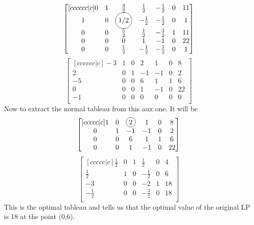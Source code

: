 \documentclass[12pt]{article}
\newcommand*\circled[1]{\tikz[baseline=(char.base)]{
		\node[shape=circle,draw,inner sep=2pt] (char) {#1};}}
\newenvironment{exercise}[2][Exercise]{\begin{trivlist}
		\item[\hskip \labelsep {\bfseries #1}\hskip \labelsep {\bfseries #2.}]}{\end{trivlist}}
\begin{document}
\begin{exercise}{1}
\[\begin{bmatrix}[cccccc|c]
	0 & 1 & \frac{3}{2} & \frac{1}{2} & -\frac{1}{2} & 0 & 11\\
	1 & 0 & \circled{1/2} &-\frac{1}{2} & -\frac{1}{2} & 0 &  1\\
	0 & 0 & \frac{5}{2} & \frac{1}{2} & -\frac{3}{2} & 1 & 11\\
	0 & 0 &  	0		&	  1 	  & 	  -1	 & 0 & 22\\
	0 & 0 & \frac{1}{2} &-\frac{1}{2} & -\frac{1}{2} & 0 &  1\\
\end{bmatrix}\]
\[\begin{bmatrix}[cccccc|c]
	-3 & 1 & 0 & 2 & 1 & 0 & 8\\
	2 & 0 & 1 & -1 & -1 & 0 &  2\\
	-5 & 0 & 0 & 6 & 1 & 1 & 6\\
	0 & 0 &  0 &  1 &  -1 & 0 & 22\\
	-1 & 0 & 0 & 0 & 0 & 0 &  0\\
\end{bmatrix}\]
Now to extract the normal tableau from this aux one. It will be 
\[\begin{bmatrix}[ccccc|c]
	 1 & 0 & \circled{2} & 1 & 0 & 8\\
	 0 & 1 & -1 & -1 & 0 &  2\\
	 0 & 0 & 6 & 1 & 1 & 6\\
	 0 &  0 &  1 &  -1 & 0 & 22\\
\end{bmatrix}\]
\[\begin{bmatrix}[ccccc|c]
	\frac{1}{2}  & 0 &  1 &  \frac{1}{2} & 0 &  4\\
 	\frac{1}{2}	 & 1 &  0 & -\frac{1}{2} & 0 &  6\\
		-3		 & 0 &  0 & 	-2		 & 1 & 18\\
	-\frac{1}{2} & 0 &  0 & -\frac{3}{2} & 0 & 18\\
\end{bmatrix}\]
This is the optimal tableau and tells us that the optimal value of the original LP is 18 at the point (0,6).
\end{exercise}
\end{document}
